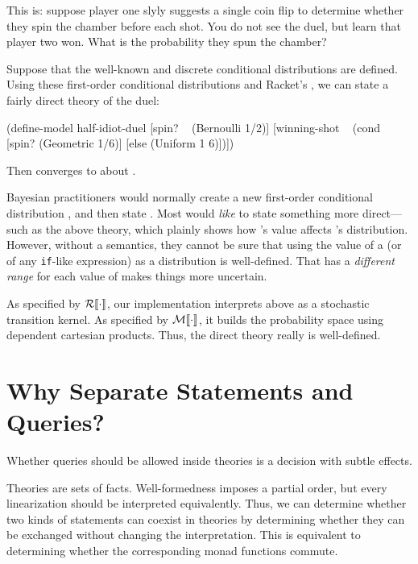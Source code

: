 This is: suppose player one slyly suggests a single coin flip to determine whether they spin the chamber before each shot. You do not see the duel, but learn that player two won. What is the probability they spun the chamber?

Suppose that the well-known  and discrete  conditional distributions are defined. Using these first-order conditional distributions and Racket's , we can state a fairly direct theory of the duel:
\begin{center}
\singlespacing
\begin{schemedisplay}
(define-model half-idiot-duel
  [spin? ~ (Bernoulli 1/2)]
  [winning-shot ~ (cond [spin?  (Geometric 1/6)]
                        [else   (Uniform 1 6)])])
\end{schemedisplay}
\end{center}
Then  converges to about .

Bayesian practitioners would normally create a new first-order conditional distribution , and then state . Most would \textit{like} to state something more direct---such as the above theory, which plainly shows how 's value affects 's distribution. However, without a semantics, they cannot be sure that using the value of a  (or of any \texttt{if}-like expression) as a distribution is well-defined. That  has a \textit{different range} for each value of  makes things more uncertain.

As specified by $\mathcal{R}\!\left\llbracket{\cdot}\right\rrbracket$, our implementation interprets  above as a stochastic transition kernel. As specified by $\mathcal{M}\!\left\llbracket{\cdot}\right\rrbracket$, it builds the probability space using dependent cartesian products. Thus, the direct theory really is well-defined.


\section{Why Separate Statements and Queries?}
\label{sec:commutativity}

Whether queries should be allowed inside theories is a decision with subtle effects.

Theories are sets of facts. Well-formedness imposes a partial order, but every linearization should be interpreted equivalently. Thus, we can determine whether two kinds of statements can coexist in theories by determining whether they can be exchanged without changing the interpretation. This is equivalent to determining whether the corresponding monad functions commute.

